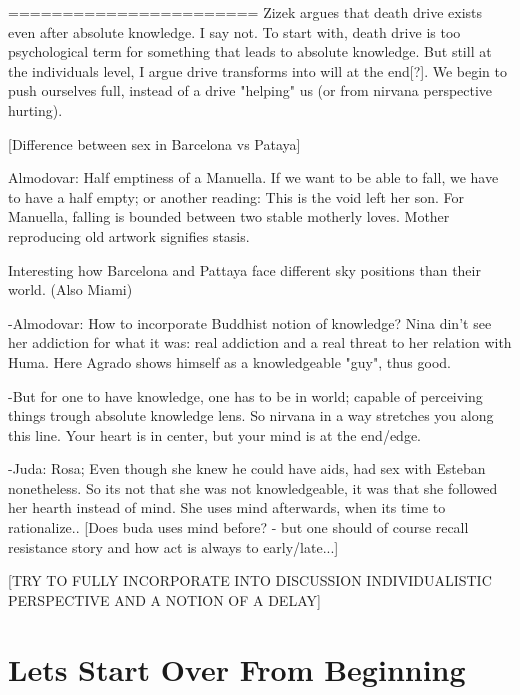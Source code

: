 \documentclass{book}
\begin{document}
=======================
Zizek argues that death drive exists even after absolute knowledge. I say not. To start with, death drive is too psychological term for something that leads to absolute knowledge. But still at the individuals level, I argue drive transforms into will at the end[?]. We begin to push ourselves full, instead of a drive "helping" us (or from nirvana perspective hurting). 

[Difference between sex in Barcelona vs Pataya]

Almodovar: Half emptiness of a Manuella. If we want to be able to fall, we have to have a half empty; or another reading: This is the void left her son.
For Manuella, falling is bounded between two stable motherly loves.
Mother reproducing old artwork signifies stasis.

Interesting how Barcelona and Pattaya face different sky positions than their world. (Also Miami)

-Almodovar: How to incorporate Buddhist notion of knowledge? Nina din't see her addiction for what it was: real addiction and a real threat to her relation with Huma. Here Agrado shows himself as a knowledgeable "guy", thus good.

-But for one to have knowledge, one has to be in world; capable of perceiving things trough absolute knowledge lens. So nirvana in a way stretches you along this line. Your heart is in center, but your mind is at the end/edge.

-Juda: Rosa; Even though she knew he could have aids, had sex with Esteban nonetheless. So its not that she was not knowledgeable, it was that she followed her hearth instead of mind. She uses mind afterwards, when its time to rationalize.. [Does buda uses mind before? - but one should of course recall resistance story and how act is always to early/late...] 

[TRY TO FULLY INCORPORATE INTO DISCUSSION INDIVIDUALISTIC PERSPECTIVE AND A NOTION OF A DELAY]

\chapter{Lets Start Over From Beginning}
\end{document}
